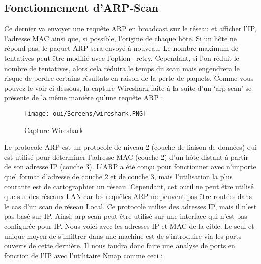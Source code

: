 \subsection{Fonctionnement d'ARP-Scan}

Ce dernier va envoyer une requête ARP en broadcast sur le réseau et afficher l’IP, l'adresse MAC ainsi que, si possible, l'origine de chaque hôte. Si un hôte ne répond pas, le paquet ARP sera envoyé à nouveau. Le nombre maximum de tentatives peut être modifié avec l'option --retry. Cependant, si l'on réduit le nombre de tentatives, alors cela réduira le temps du scan mais engendrera le risque de perdre certains résultats en raison de la perte de paquets.
Comme vous pouvez le voir ci-dessous, la capture Wireshark faite à la suite d’un ‘arp-scan’ se présente de la même manière qu’une requête ARP : 

\begin{figure}[htp!]
  \centering
  \setlength\figureheight{7cm}
  \setlength\figurewidth{9cm}
  \texttt{[image: oui/Screens/wireshark.PNG]}
  \caption{Capture Wireshark}
  \label{fig:courbe-tikz}
\end{figure}

\newpage
Le protocole ARP est un protocole de niveau 2 (couche de liaison de données) qui est utilisé pour déterminer l'adresse MAC (couche 2) d'un hôte distant à partir de son adresse IP (couche 3). L'ARP a été conçu pour fonctionner avec n'importe quel format d'adresse de couche 2 et de couche 3, mais l'utilisation la plus courante est de cartographier un réseau.
Cependant, cet outil ne peut être utilisé que sur des réseaux LAN car les requêtes ARP ne peuvent pas être routées dans le cas d’un scan de réseau Local.
Ce protocole utilise des adresses IP, mais il n'est pas basé sur IP. Ainsi, arp-scan peut être utilisé sur une interface qui n'est pas configurée pour IP.
Nous voici avec les adresses IP et MAC de la cible.
Le seul et unique moyen de s’infiltrer dans une machine est de s’introduire via les ports ouverts de cette dernière. Il nous faudra donc faire une analyse de ports en fonction de l’IP avec l’utilitaire Nmap comme ceci :

